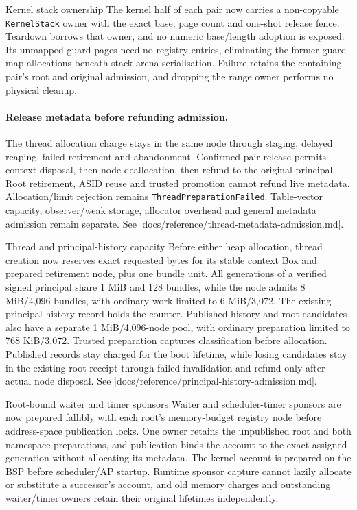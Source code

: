 \begin{implementationdetail}{Kernel stack ownership}
The kernel half of each pair now carries a non-copyable \texttt{KernelStack}
owner with the exact base, page count and one-shot release fence. Teardown
borrows that owner, and no numeric base/length adoption is exposed. Its unmapped
guard pages need no registry entries, eliminating the former guard-map
allocations beneath stack-arena serialisation. Failure retains the containing
pair's root and original admission, and dropping the range owner performs no
physical cleanup.
\end{implementationdetail}

\paragraph*{Release metadata before refunding admission.}

The thread allocation charge stays in the same node through staging, delayed
reaping, failed retirement and abandonment.
Confirmed pair release permits context disposal, then node deallocation, then
refund to the original principal. Root retirement, ASID reuse and trusted
promotion cannot refund live metadata. Allocation/limit rejection remains
\texttt{ThreadPreparationFailed}. Table-vector capacity, observer/weak storage,
allocator overhead and general metadata admission remain separate. See
\repofile|docs/reference/thread-metadata-admission.md|.

\begin{implementationdetail}{Thread and principal-history capacity}
Before either heap allocation, thread creation now reserves exact requested
bytes for its stable context Box and prepared retirement node, plus one bundle
unit. All generations of a verified signed principal share 1 MiB and 128 bundles, while
the node admits 8 MiB/4,096 bundles, with ordinary work limited to 6 MiB/3,072.
The existing principal-history record holds the counter. Published history and
root candidates also have a separate 1 MiB/4,096-node pool, with ordinary
preparation limited to 768 KiB/3,072. Trusted preparation captures classification
before allocation. Published records stay charged for the boot lifetime, while losing
candidates stay in the existing root receipt through failed invalidation and
refund only after actual node disposal. See
\repofile|docs/reference/principal-history-admission.md|.
\end{implementationdetail}

\begin{implementationdetail}{Root-bound waiter and timer sponsors}
Waiter and scheduler-timer sponsors are now prepared fallibly with each root's
memory-budget registry node before address-space publication locks. One owner
retains the unpublished root and both namespace preparations, and publication binds
the account to the exact assigned generation without allocating its metadata.
The kernel account is prepared on the BSP before scheduler/AP startup. Runtime
sponsor capture cannot lazily allocate or substitute a successor's account, and
old memory charges and outstanding waiter/timer owners retain their original
lifetimes independently.
\end{implementationdetail}

